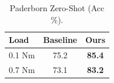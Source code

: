 \begin{table}[htbp]
\centering
\caption{Paderborn Zero-Shot (Acc \%).}
\label{tab:V}
\begin{tabular}{@{}lcc@{}}
\toprule
Load & Baseline & Ours \\
\midrule
0.1 Nm & 75.2 & \textbf{85.4} \\
0.7 Nm & 73.1 & \textbf{83.2} \\
\bottomrule
\end{tabular}
\end{table}
